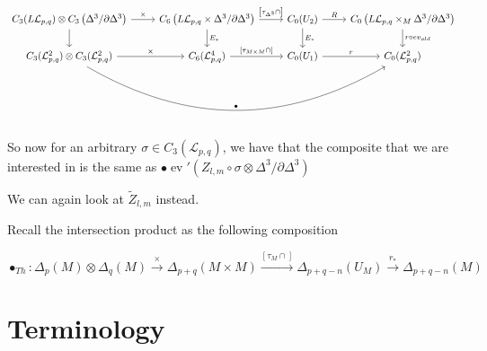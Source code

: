 \documentclass[reqno]{amsart}
\theoremstyle{definition}
\theoremstyle{remark}
\DeclareMathOperator{\ev}{ev}
\begin{document}
    \begin{equation*}
    \begin{tikzcd}
        C_3 (L \mathcal{L}_{p,q}) \otimes
        C_{3}\left( \Delta^3 / \partial \Delta^3 \right) 
        \ar[r, "\times "] \ar[d] & C_6 \left( L \mathcal{L}_{p,q} \times 
        \Delta^3 / \partial \Delta^3 \right) 
        \ar[r, "{\left[ \tau_{\Delta^3} \cap \right]}"]
        \ar[d, "E_*"] &
        C_0 (U_2) \ar[r, "R"] \ar[d, "E_*"] 
        & C_0 \left( L \mathcal{L}_{p,q} \times_M 
        \Delta^3 / \partial \Delta^3 \right) \ar[d, "r \circ ev_{old}"] \\
            C_3 (\mathcal{L}_{p,q}^2)
            \otimes C_3 (\mathcal{L}_{p,q}^2) \ar[r, "\times "] 
            \ar[rrr, bend right, "\bullet"]& 
            C_6 (\mathcal{L}_{p,q}^{4}) \ar[r, "{\left[ \tau_{M \times M}\cap \right] }"]
            & C_0 (U_1) \ar[r,
            "r"] & C_0 (\mathcal{L}_{p,q}^2)
    \end{tikzcd}
    \end{equation*}
    
    So now for
    an arbitrary 
    $\sigma \in C_3 \left( \mathcal{L}_{p,q} \right) $, we
    have that the composite that we are interested in is
    the same as
    $\bullet \ev'
    (Z_{l,m} \circ \sigma \otimes \Delta^3 / \partial \Delta^3 )$








    We can again look at
    $\tilde{Z}_{l,m}$ instead.

    Recall the intersection product as the following composition

    \[
    \bullet_{Th} \colon \Delta_p(M) \otimes
    \Delta_q(M) \stackrel{\times }{\to} \Delta_{p+q}(M \times M)
    \stackrel{\left[ \tau_M \cap \right] }{\to} 
    \Delta_{p+q-n}(U_M) \stackrel{r_*}{\to} \Delta_{p+q-n}(M)
    \] 

















\newpage


\section{Terminology}\label{Section:Terminology}
\end{document}

